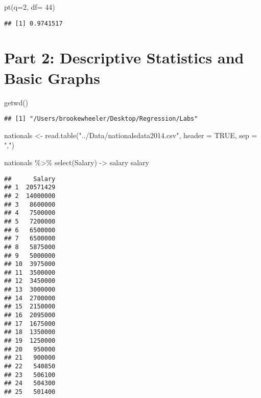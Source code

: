 \documentclass[
]{article}
\newenvironment{Shaded}{\begin{snugshade}}{\end{snugshade}}
\newcommand{\AttributeTok}[1]{\textcolor[rgb]{0.77,0.63,0.00}{#1}}
\newcommand{\ConstantTok}[1]{\textcolor[rgb]{0.00,0.00,0.00}{#1}}
\newcommand{\DecValTok}[1]{\textcolor[rgb]{0.00,0.00,0.81}{#1}}
\newcommand{\FunctionTok}[1]{\textcolor[rgb]{0.00,0.00,0.00}{#1}}
\newcommand{\NormalTok}[1]{#1}
\newcommand{\OtherTok}[1]{\textcolor[rgb]{0.56,0.35,0.01}{#1}}
\newcommand{\SpecialCharTok}[1]{\textcolor[rgb]{0.00,0.00,0.00}{#1}}
\newcommand{\StringTok}[1]{\textcolor[rgb]{0.31,0.60,0.02}{#1}}
\begin{document}
\begin{Shaded}
\begin{Highlighting}[]
\FunctionTok{pt}\NormalTok{(}\AttributeTok{q=}\DecValTok{2}\NormalTok{, }\AttributeTok{df=} \DecValTok{44}\NormalTok{)}
\end{Highlighting}
\end{Shaded}

\begin{verbatim}
## [1] 0.9741517
\end{verbatim}

\hypertarget{part-2-descriptive-statistics-and-basic-graphs}{%
\section{Part 2: Descriptive Statistics and Basic
Graphs}\label{part-2-descriptive-statistics-and-basic-graphs}}

\begin{Shaded}
\begin{Highlighting}[]
\FunctionTok{getwd}\NormalTok{()}
\end{Highlighting}
\end{Shaded}

\begin{verbatim}
## [1] "/Users/brookewheeler/Desktop/Regression/Labs"
\end{verbatim}

\begin{Shaded}
\begin{Highlighting}[]
\NormalTok{nationals }\OtherTok{\textless{}{-}} \FunctionTok{read.table}\NormalTok{(}\StringTok{"../Data/nationalsdata2014.csv"}\NormalTok{, }\AttributeTok{header =} \ConstantTok{TRUE}\NormalTok{, }\AttributeTok{sep =} \StringTok{","}\NormalTok{)}

\NormalTok{nationals }\SpecialCharTok{\%\textgreater{}\%}
  \FunctionTok{select}\NormalTok{(Salary)  }\OtherTok{{-}\textgreater{}}\NormalTok{ salary}
\NormalTok{salary}
\end{Highlighting}
\end{Shaded}

\begin{verbatim}
##      Salary
## 1  20571429
## 2  14000000
## 3   8600000
## 4   7500000
## 5   7200000
## 6   6500000
## 7   6500000
## 8   5875000
## 9   5000000
## 10  3975000
## 11  3500000
## 12  3450000
## 13  3000000
## 14  2700000
## 15  2150000
## 16  2095000
## 17  1675000
## 18  1350000
## 19  1250000
## 20   950000
## 21   900000
## 22   540850
## 23   506100
## 24   504300
## 25   501400
\end{verbatim}
\end{document}
